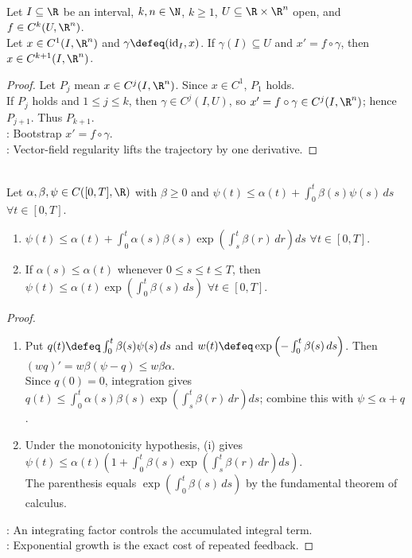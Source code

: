 \begin{lemma} \label{lem:ode-solution-time-regularity} \\
Let $I\subseteq\R$ be an interval, $k,n\in\N$, $k\geq1$, $U\subseteq\R\times\R^n$ open, and $f\in C^k(U,\R^n)$.\\
Let $x\in C^1(I,\R^n)$ and $\gamma\defeq(\operatorname{id}_I,x)$. If $\gamma(I)\subseteq U$ and $x'=f\circ\gamma$, then $x\in C^{k+1}(I,\R^n)$.
\begin{proof}
Let $P_j$ mean $x\in C^j(I,\R^n)$. Since $x\in C^1$, $P_1$ holds.\\
If $P_j$ holds and $1\leq j\leq k$, then $\gamma\in C^j(I,U)$, so $x'=f\circ\gamma\in C^j(I,\R^n)$; hence $P_{j+1}$. Thus $P_{k+1}$.\\
: Bootstrap $x'=f\circ\gamma$.\\
: Vector-field regularity lifts the trajectory by one derivative.
\end{proof}
\end{lemma}

\begin{lemma} \label{lem:generalized-gronwall-integral-inequality} \\
Let $\alpha,\beta,\psi\in C([0,T],\R)$ with $\beta\geq0$ and $\psi(t)\leq\alpha(t)+\int_0^t\beta(s)\psi(s)\,ds$ $\forall t\in[0,T]$.
\begin{enumerate}[label=(\roman*)]
\setlength{\itemsep}{0pt}
\item $\psi(t)\leq\alpha(t)+\int_0^t\alpha(s)\beta(s)\exp\left(\int_s^t\beta(r)\,dr\right)ds$ $\forall t\in[0,T]$.
\item If $\alpha(s)\leq\alpha(t)$ whenever $0\leq s\leq t\leq T$, then $\psi(t)\leq\alpha(t)\exp\left(\int_0^t\beta(s)\,ds\right)$ $\forall t\in[0,T]$.
\end{enumerate}
\begin{proof}
\begin{enumerate}[label=(\roman*)]
\setlength{\itemsep}{0pt}
\item Put $q(t)\defeq\int_0^t\beta(s)\psi(s)\,ds$ and $w(t)\defeq\exp\left(-\int_0^t\beta(s)\,ds\right)$. Then $(wq)'=w\beta(\psi-q)\leq w\beta\alpha$.\\
Since $q(0)=0$, integration gives $q(t)\leq\int_0^t\alpha(s)\beta(s)\exp\left(\int_s^t\beta(r)\,dr\right)ds$; combine this with $\psi\leq\alpha+q$.
\item Under the monotonicity hypothesis, (i) gives $\psi(t)\leq\alpha(t)\left(1+\int_0^t\beta(s)\exp\left(\int_s^t\beta(r)\,dr\right)ds\right)$.\\
The parenthesis equals $\exp\left(\int_0^t\beta(s)\,ds\right)$ by the fundamental theorem of calculus.
\end{enumerate}
: An integrating factor controls the accumulated integral term.\\
: Exponential growth is the exact cost of repeated feedback.
\end{proof}
\end{lemma}


